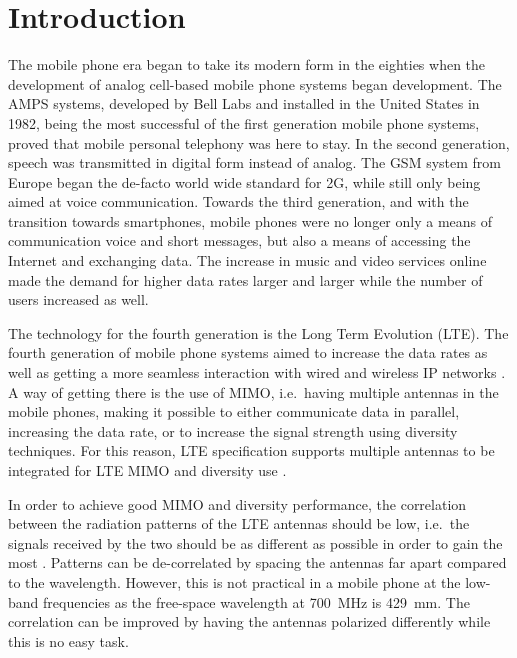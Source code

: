 \chapter{Introduction}
\label{cha:intro}

The mobile phone era began to take its modern form in the eighties when the development of analog cell-based mobile phone systems began development. The AMPS systems, developed by Bell Labs and installed in the United States in 1982, being the most successful of the first generation mobile phone systems, proved that mobile personal telephony was here to stay. In the second generation, speech was transmitted in digital form instead of analog. The GSM system from Europe began the de-facto world wide standard for 2G, while still only being aimed at voice communication. Towards the third generation, and with the transition towards smartphones, mobile phones were no longer only a means of communication voice and short messages, but also a means of accessing the Internet and exchanging data. The increase in music and video services online made the demand for higher data rates larger and larger while the number of users increased as well.

The technology for the fourth generation is the Long Term Evolution (LTE). The fourth generation of mobile phone systems aimed to increase the data rates as well as getting a more seamless interaction with wired and wireless IP networks \cite{tanenbaum2012computer}. A way of getting there is the use of MIMO, i.e.\ having multiple antennas in the mobile phones, making it possible to either communicate data in parallel, increasing the data rate, or to increase the signal strength using diversity techniques. For this reason, LTE specification supports multiple antennas to be integrated for LTE MIMO and diversity use \cite{holma2011lte}.

In order to achieve good MIMO and diversity performance, the correlation between the radiation patterns of the LTE antennas should be low, i.e.\ the signals received by the two should be as different as possible in order to gain the most \cite{Tim2012Practical}. Patterns can be de-correlated by spacing the antennas far apart compared to the wavelength. However, this is not practical in a mobile phone at the low-band frequencies as the free-space wavelength at \SI{700}{MHz} is \SI{429}{mm}. The correlation can be improved by having the antennas polarized differently while this is no easy task.

